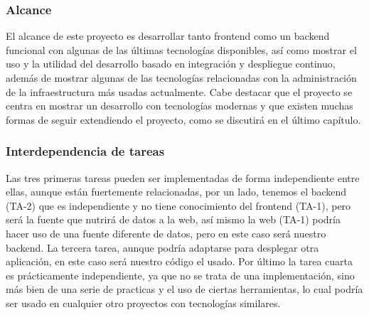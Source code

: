 \subsubsection{Alcance}
El alcance de este proyecto es desarrollar tanto frontend como un backend funcional con algunas de las últimas tecnologías disponibles,
así como mostrar el uso y la utilidad del desarrollo basado en integración y despliegue continuo, además de mostrar algunas de 
las tecnologías relacionadas con la administración de la infraestructura más usadas actualmente. Cabe destacar que el proyecto se centra
en mostrar un desarrollo con tecnologías modernas y que existen muchas formas de seguir extendiendo el proyecto, como se discutirá en el 
último capítulo.


\subsubsection{Interdependencia de tareas}
Las tres primeras tareas pueden ser implementadas de forma independiente entre ellas, aunque están fuertemente relacionadas, por un lado, tenemos el backend (TA-2) que es independiente y no tiene conocimiento del frontend (TA-1), pero será la fuente que nutrirá de datos a la web, así mismo la web (TA-1) podría hacer uso de una fuente diferente de datos, pero en este caso será nuestro backend. La tercera tarea, aunque podría adaptarse para desplegar otra aplicación, en este caso será nuestro código el usado. Por último la tarea cuarta es prácticamente independiente, ya que no se trata de una implementación, sino más bien de una serie de practicas y el uso de ciertas herramientas, lo cual podría ser usado en cualquier otro proyectos con tecnologías similares.


